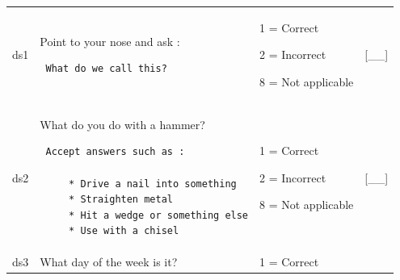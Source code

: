 \documentclass[12pt,a4paper]{book}
\theoremstyle{definition}
\theoremstyle{definition}
\theoremstyle{definition}
\theoremstyle{remark}
\begin{document}
\begin{longtable}[]{@{}llll@{}}
\toprule
\begin{minipage}[t]{0.24\columnwidth}\raggedright
ds1\strut
\end{minipage} & \begin{minipage}[t]{0.24\columnwidth}\raggedright
Point to your nose and ask :

\begin{verbatim}
 What do we call this?
\end{verbatim}
\strut
\end{minipage} & \begin{minipage}[t]{0.24\columnwidth}\raggedright
1 = Correct

2 = Incorrect

8 = Not applicable\strut
\end{minipage} & \begin{minipage}[t]{0.24\columnwidth}\raggedright
{[}\_\_{]}\strut
\end{minipage}\tabularnewline
\begin{minipage}[t]{0.24\columnwidth}\raggedright
ds2\strut
\end{minipage} & \begin{minipage}[t]{0.24\columnwidth}\raggedright
What do you do with a hammer?

\begin{verbatim}
 Accept answers such as :

     * Drive a nail into something
     * Straighten metal
     * Hit a wedge or something else
     * Use with a chisel
\end{verbatim}
\strut
\end{minipage} & \begin{minipage}[t]{0.24\columnwidth}\raggedright
1 = Correct

2 = Incorrect

8 = Not applicable\strut
\end{minipage} & \begin{minipage}[t]{0.24\columnwidth}\raggedright
{[}\_\_{]}\strut
\end{minipage}\tabularnewline
\begin{minipage}[t]{0.24\columnwidth}\raggedright
ds3\strut
\end{minipage} & \begin{minipage}[t]{0.24\columnwidth}\raggedright
What day of the week is it?\strut
\end{minipage} & \begin{minipage}[t]{0.24\columnwidth}\raggedright
1 = Correct


\end{minipage}
\end{longtable}
\end{document}
